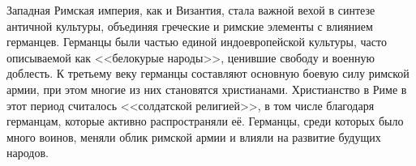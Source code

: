 Западная Римская империя, как и Византия, стала важной вехой в синтезе античной культуры, объединяя греческие и римские элементы с влиянием германцев. Германцы были частью единой индоевропейской культуры, часто описываемой как <<белокурые народы>>, ценившие свободу и военную доблесть. К третьему веку германцы составляют основную боевую силу римской армии, при этом многие из них становятся христианами. Христианство в Риме в этот период считалось <<солдатской религией>>, в том числе благодаря германцам, которые активно распространяли её. Германцы, среди которых было много воинов, меняли облик римской армии и влияли на развитие будущих народов.


